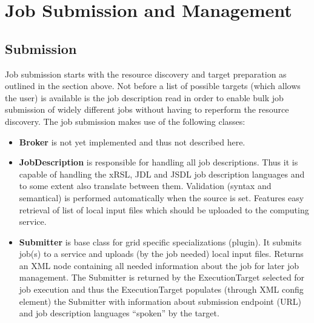 \documentclass{book}
\begin{document}
\chapter{Job Submission and Management}
\label{sec:JobManagement}
\section{Submission}
Job submission starts with the resource discovery and target preparation as outlined in the section above. Not before a list 
of possible targets (which allows the user) is available is the job description read in order to enable bulk job submission of 
widely different jobs without having to reperform the resource discovery. The job submission makes use of the following classes:

\begin{itemize}
\item{{\bf Broker} is not yet implemented and thus not described here.}

\item{{\bf JobDescription} is responsible for handling all job descriptions. Thus it is capable of handling the xRSL, JDL and 
JSDL job description languages and to some extent also translate between them. Validation (syntax and semantical) is performed 
automatically when the source is set. Features easy retrieval of list of local input files which should be uploaded to the 
computing service.}

\item{{\bf Submitter} is base class for grid specific specializations (plugin).  It submits job(s) to a service and 
uploads (by the job needed) local input files. Returns an XML node containing all needed information about the job 
for later job management. The Submitter is returned by the ExecutionTarget selected for job execution and thus the 
ExecutionTarget populates (through XML config element) the Submitter with information about submission endpoint (URL) 
and job description languages ``spoken'' by the target.}

\end{itemize}
\end{document}
